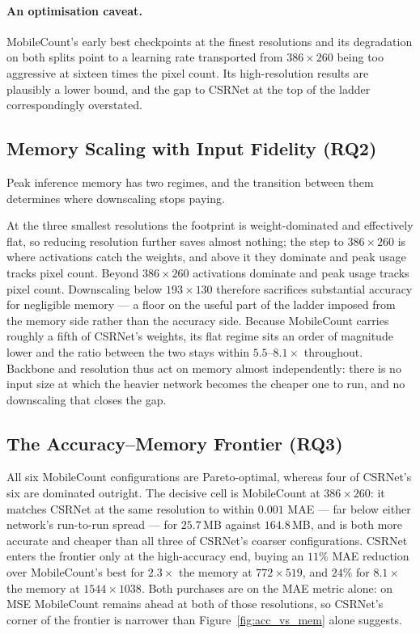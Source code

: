 \documentclass[conference]{IEEEtran}
\begin{document}
\paragraph{An optimisation caveat.}
MobileCount's early best checkpoints at the finest resolutions and its
degradation on both splits point to a learning rate transported from
$386\times260$ being too aggressive at sixteen times the pixel count. Its
high-resolution results are plausibly a lower bound, and the gap to CSRNet at
the top of the ladder correspondingly overstated.

\subsection{Memory Scaling with Input Fidelity (RQ2)}
\label{subsec:disc_memory}

Peak inference memory has two regimes, and the transition between them
determines where downscaling stops paying. 

At the three smallest resolutions the
footprint is weight-dominated and effectively flat, so reducing resolution further saves almost nothing; the step to $386\times260$ is where activations catch the weights, and above it they dominate and peak usage tracks pixel count. Beyond $386\times260$ activations dominate and peak usage tracks pixel count. Downscaling below $193\times130$ therefore sacrifices substantial accuracy for negligible memory --- a floor on the useful
part of the ladder imposed from the memory side rather than the accuracy side.
Because MobileCount carries roughly a fifth of CSRNet's weights, its flat regime
sits an order of magnitude lower and the ratio between the two stays within
$5.5$--$8.1\times$ throughout. Backbone and resolution thus act on memory almost
independently: there is no input size at which the heavier network becomes the
cheaper one to run, and no downscaling that closes the gap.

\subsection{The Accuracy--Memory Frontier (RQ3)}
\label{subsec:disc_pareto}

All six MobileCount configurations are Pareto-optimal, whereas four of CSRNet's
six are dominated outright. The decisive cell is MobileCount at $386\times260$:
it matches CSRNet at the same resolution to within $0.001$ MAE --- far below
either network's run-to-run spread --- for $25.7$\,MB against $164.8$\,MB, and
is both more accurate and cheaper than all three of CSRNet's coarser
configurations. CSRNet enters the frontier only at the high-accuracy end, buying
an $11\%$ MAE reduction over MobileCount's best for $2.3\times$ the memory at
$772\times519$, and $24\%$ for $8.1\times$ the memory at $1544\times1038$. Both purchases are on the MAE metric alone: on MSE
MobileCount remains ahead at both of those resolutions, so CSRNet's corner of
the frontier is narrower than Figure~\ref{fig:acc_vs_mem} alone suggests.
\end{document}
